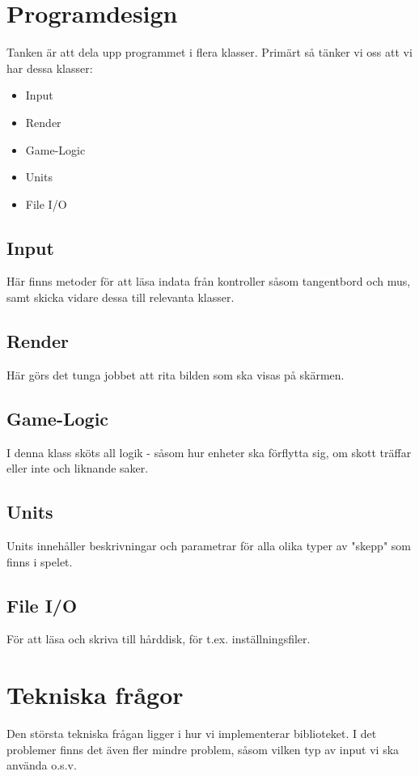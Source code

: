 \documentclass[a4paper,11pt]{article}
\begin{document}
\section{Programdesign}
Tanken är att dela upp programmet i flera klasser. Primärt så tänker vi oss att vi har dessa klasser:
\begin{multicols}{2}
\begin{itemize}
\item Input
\item Render
\item Game-Logic
\item Units
\item File I/O
\end{itemize}

\subsection{Input}
Här finns metoder för att läsa indata från kontroller såsom tangentbord och mus, samt skicka vidare dessa till relevanta klasser.

\subsection{Render}
Här görs det tunga jobbet att rita bilden som ska visas på skärmen.

\subsection{Game-Logic}
I denna klass sköts all logik - såsom hur enheter ska förflytta sig, om skott träffar eller inte och liknande saker.

\subsection{Units}
Units innehåller beskrivningar och parametrar för alla olika typer av "skepp" som finns i spelet.

\subsection{File I/O}
För att läsa och skriva till hårddisk, för t.ex. inställningsfiler.
\end{multicols}

\section{Tekniska frågor}
Den största tekniska frågan ligger i hur vi implementerar biblioteket. I det problemer finns det även fler mindre problem, såsom vilken typ av input vi ska använda o.s.v. 
\end{document}
